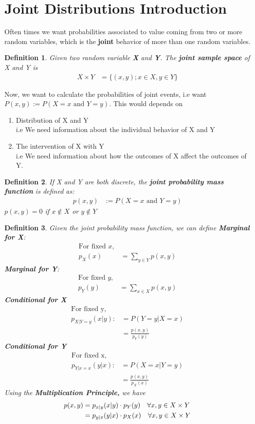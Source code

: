 \documentclass[11pt,oneside]{book}
\theoremstyle{break}
\theoremstyle{break}
\newtheorem{defn}{Definition}[corL]
\begin{document}
\section[Joint Distributions Introduction]{\color{DarkOrchid}Joint Distributions Introduction\color{black} }
Often times we want probabilities associated to value coming from two or more random variables, which is the \textbf{joint} behavior of more than one random variables.\\
\begin{defn}
Given two random variable \textbf{X} and \textbf{Y}. The \textbf{joint sample space} of X and Y is \begin{align*}
X\times Y&=\{(x,y);x\in X,y\in Y\}
\end{align*}
\end{defn}
Now, we want to calculate the probabilities of joint events, i.e want $P(x,y):=P(X=x\text{ and }Y=y)$. This would depends on \begin{enumerate}
\item Distribution of X and Y\\
i.e We need information about the individual behavior of X and Y
\item The intervention of X with Y\\
i.e We need information about how the outcomes of X affect the outcomes of Y.
\end{enumerate}
\begin{defn}
If X and Y are both discrete, the \textbf{joint probability mass function} is defined as:\begin{align*}
p(x,y)&:=P(X=x\text{ and }Y=y)
\end{align*}
$p(x,y)=0$ if $x\notin X$ or $y\notin Y$
\end{defn}
\begin{defn}
Given the joint probability mass function, we can define
\textbf{Marginal for X}:\begin{align*}
\text{For fixed }x,\\
p_X(x)&=\sum_{y\in Y}p(x,y)
\end{align*}
\textbf{Marginal for Y}:\begin{align*}
\text{For fixed }y,\\
p_Y(y)&=\sum_{x\in X}p(x,y)
\end{align*}
\textbf{Conditional for X}\begin{align*}
\text{For fixed y,}\\
p_{X|Y=y}(x|y):&=P(Y=y|X=x)\\
&=\frac{p(x,y)}{p_Y(y)}
\end{align*}
\textbf{Conditional for Y}
\begin{align*}
\text{For fixed x,}\\
p_{Y|x=x}(y|x):&=P(X=x|Y=y)\\
&=\frac{p(x,y)}{p_X(x)}
\end{align*}
Using the \textbf{Multiplication Principle,} we have \begin{align*}
p(x,y)&=p_{x|y}(x|y)\cdot p_Y(y)\text{\quad}\forall x,y\in X\times Y\\
&=p_{y|x}(y|x)\cdot p_X(x)\text{\quad}\forall x,y\in X\times Y
\end{align*}
\end{defn}
\end{document}

